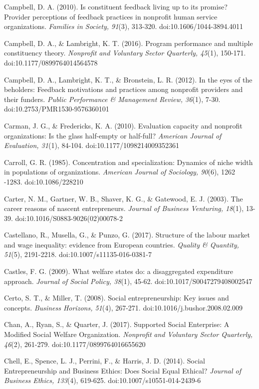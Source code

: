 \documentclass{article}
\begin{document}
Campbell, D. A. (2010). Is constituent feedback living up to its promise? Provider perceptions of feedback practices in nonprofit human service organizations. \emph{Families in Society, 91}(3), 313-320. doi:10.1606/1044-3894.4011

Campbell, D. A., \& Lambright, K. T. (2016). Program performance and multiple constituency theory. \emph{Nonprofit}\emph{ and Voluntary Sector Quarterly, 45}(1), 150-171. doi:10.1177/0899764014564578

Campbell, D. A., Lambright, K. T., \& Bronstein, L. R. (2012). In the eyes of the beholders: Feedback motivations and practices among nonprofit providers and their funders. \emph{Public Performance \& Management Review, 36}(1), 7-30. doi:10.2753/PMR1530-9576360101

Carman, J. G., \& Fredericks, K. A. (2010). Evaluation capacity and nonprofit organizations: Is the glass half-empty or half-full? \emph{American Journal of Evaluation, 31}(1), 84-104. doi:10.1177/1098214009352361

Carroll, G. R. (1985). Concentration and specialization: Dynamics of niche width in populations of organizations. \emph{American Journal of Sociology, 90}(6), 1262 -1283. doi:10.1086/228210

Carter, N. M., Gartner, W. B., Shaver, K. G., \& Gatewood, E. J. (2003). The career reasons of nascent entrepreneurs. \emph{Journal of Business Venturing, 18}(1), 13-39. doi:10.1016/S0883-9026(02)00078-2

Castellano, R., Musella, G., \& Punzo, G. (2017). Structure of the labour market and wage inequality: evidence from European countries. \emph{Quality \& Quantity, 51}(5), 2191-2218. doi:10.1007/s11135-016-0381-7

Castles, F. G. (2009). What welfare states do: a disaggregated expenditure approach. \emph{Journal of Social Policy, 38}(1), 45-62. doi:10.1017/S0047279408002547

Certo, S. T., \& Miller, T. (2008). Social entrepreneurship: Key issues and concepts. \emph{Business Horizons, 51}(4), 267-271. doi:10.1016/j.bushor.2008.02.009

Chan, A., Ryan, S., \& Quarter, J. (2017). Supported Social Enterprise: A Modified Social Welfare Organization. \emph{Nonprofit}\emph{ and Voluntary Sector Quarterly, 46}(2), 261-279. doi:10.1177/0899764016655620

Chell, E., Spence, L. J., Perrini, F., \& Harris, J. D. (2014). Social Entrepreneurship and Business Ethics: Does Social Equal Ethical? \emph{Journal of Business Ethics, 133}(4), 619-625. doi:10.1007/s10551-014-2439-6
\end{document}
